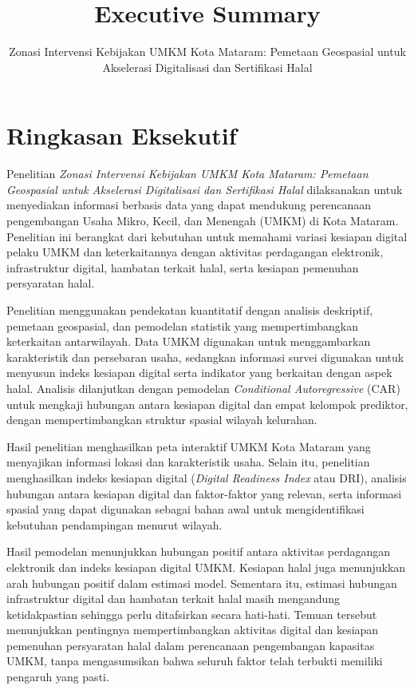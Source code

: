 \documentclass[
  indonesian,
  11pt,
  a4paper,
]{report}
\title{Executive Summary}
\subtitle{Zonasi Intervensi Kebijakan UMKM Kota Mataram: Pemetaan
Geospasial untuk Akselerasi Digitalisasi dan Sertifikasi Halal}
\author{}
\date{}
\begin{document}
\maketitle


\chapter*{Ringkasan Eksekutif}\label{ringkasan-eksekutif}

Penelitian \emph{Zonasi Intervensi Kebijakan UMKM Kota Mataram: Pemetaan
Geospasial untuk Akselerasi Digitalisasi dan Sertifikasi Halal}
dilaksanakan untuk menyediakan informasi berbasis data yang dapat
mendukung perencanaan pengembangan Usaha Mikro, Kecil, dan Menengah
(UMKM) di Kota Mataram. Penelitian ini berangkat dari kebutuhan untuk
memahami variasi kesiapan digital pelaku UMKM dan keterkaitannya dengan
aktivitas perdagangan elektronik, infrastruktur digital, hambatan
terkait halal, serta kesiapan pemenuhan persyaratan halal.

Penelitian menggunakan pendekatan kuantitatif dengan analisis
deskriptif, pemetaan geospasial, dan pemodelan statistik yang
mempertimbangkan keterkaitan antarwilayah. Data UMKM digunakan untuk
menggambarkan karakteristik dan persebaran usaha, sedangkan informasi
survei digunakan untuk menyusun indeks kesiapan digital serta indikator
yang berkaitan dengan aspek halal. Analisis dilanjutkan dengan pemodelan
\emph{Conditional Autoregressive} (CAR) untuk mengkaji hubungan antara
kesiapan digital dan empat kelompok prediktor, dengan mempertimbangkan
struktur spasial wilayah kelurahan.

Hasil penelitian menghasilkan peta interaktif UMKM Kota Mataram yang
menyajikan informasi lokasi dan karakteristik usaha. Selain itu,
penelitian menghasilkan indeks kesiapan digital (\emph{Digital Readiness
Index} atau DRI), analisis hubungan antara kesiapan digital dan
faktor-faktor yang relevan, serta informasi spasial yang dapat digunakan
sebagai bahan awal untuk mengidentifikasi kebutuhan pendampingan menurut
wilayah.

Hasil pemodelan menunjukkan hubungan positif antara aktivitas
perdagangan elektronik dan indeks kesiapan digital UMKM. Kesiapan halal
juga menunjukkan arah hubungan positif dalam estimasi model. Sementara
itu, estimasi hubungan infrastruktur digital dan hambatan terkait halal
masih mengandung ketidakpastian sehingga perlu ditafsirkan secara
hati-hati. Temuan tersebut menunjukkan pentingnya mempertimbangkan
aktivitas digital dan kesiapan pemenuhan persyaratan halal dalam
perencanaan pengembangan kapasitas UMKM, tanpa mengasumsikan bahwa
seluruh faktor telah terbukti memiliki pengaruh yang pasti.
\end{document}
